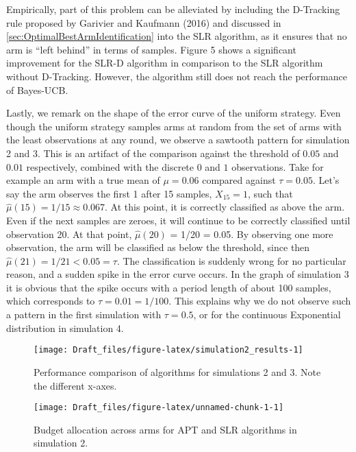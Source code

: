 \documentclass[11pt,]{article}
\begin{document}
Empirically, part of this problem can be alleviated by including the
D-Tracking rule proposed by Garivier and Kaufmann (2016) and discussed
in \autoref{sec:OptimalBestArmIdentification} into the SLR algorithm, as
it ensures that no arm is ``left behind'' in terms of samples. Figure 5
shows a significant improvement for the SLR-D algorithm in comparison to
the SLR algorithm without D-Tracking. However, the algorithm still does
not reach the performance of Bayes-UCB.

Lastly, we remark on the shape of the error curve of the uniform
strategy. Even though the uniform strategy samples arms at random from
the set of arms with the least observations at any round, we observe a
sawtooth pattern for simulation 2 and 3. This is an artifact of the
comparison against the threshold of \(0.05\) and \(0.01\) respectively,
combined with the discrete \(0\) and \(1\) observations. Take for
example an arm with a true mean of \(\mu = 0.06\) compared against
\(\tau = 0.05\). Let's say the arm observes the first 1 after 15
samples, \(X_{15} = 1\), such that
\(\hat{\mu}(15) = 1/15 \approx 0.067\). At this point, it is correctly
classified as above the arm. Even if the next samples are zeroes, it
will continue to be correctly classified until observation 20. At that
point, \(\hat{\mu}(20)\) = 1/20 = 0.05. By observing one more
observation, the arm will be classified as below the threshold, since
then \(\hat{\mu}(21) = 1/21 < 0.05 = \tau\). The classification is
suddenly wrong for no particular reason, and a sudden spike in the error
curve occurs. In the graph of simulation 3 it is obvious that the spike
occurs with a period length of about 100 samples, which corresponds to
\(\tau = 0.01=1/100\). This explains why we do not observe such a
pattern in the first simulation with \(\tau = 0.5\), or for the
continuous Exponential distribution in simulation 4.

\begin{figure}

{\centering \texttt{[image: Draft\_files/figure-latex/simulation2\_results-1]} 

}

\caption{Performance comparison of algorithms for simulations 2 and 3. Note the different x-axes.}\label{fig:simulation2_results}
\end{figure}

\begin{figure}

{\centering \texttt{[image: Draft\_files/figure-latex/unnamed-chunk-1-1]} 

}

\caption{Budget allocation across arms for APT and SLR algorithms in simulation 2.}\label{fig:unnamed-chunk-1}
\end{figure}
\end{document}
